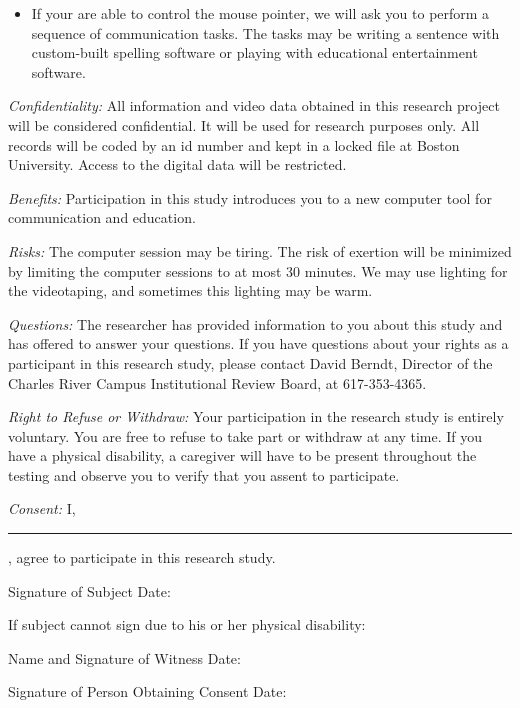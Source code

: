 \begin{letter}
\begin{itemize}
\item If your are able to control the mouse pointer, we will ask you
to perform a sequence of communication tasks.  The tasks may be
writing a sentence with custom-built spelling software or playing with
educational entertainment software.

\end{itemize}

{\em Confidentiality:}  All information and video data obtained in this
research project will be considered confidential.  It will be used for
research purposes only.  All records will be coded by an id number and
kept in a locked file at Boston University.  Access to the digital
data will be restricted.

{\em Benefits:} Participation in this study introduces you to a new
computer tool for communication and education.

{\em Risks:} The computer session may be tiring.  The risk of exertion
will be minimized by limiting the computer sessions to at most 30
minutes. We may use lighting for the videotaping, and sometimes this
lighting may be warm.


{\em Questions:} The researcher has provided information to you about
this study and has offered to answer your questions.  If you have
questions about your rights as a participant in this research study,
please contact David Berndt, Director of the Charles River Campus
Institutional Review Board, at 617-353-4365.


{\em Right to Refuse or Withdraw:} Your participation in the research
study is entirely voluntary.  You are free to refuse to take part or
withdraw at any time. If you have a physical disability, a caregiver
will have to be present throughout the testing and observe you to
verify that you assent to participate.

{\em Consent:} I,  \rule{5cm}{.01cm}, agree to participate in this research
study.

Signature of Subject \hrulefill  Date: \hrulefill

If subject cannot sign due to his or her physical disability:

Name and Signature of Witness \hrulefill  Date: \hrulefill


\vspace*{.5cm}


Signature of Person Obtaining Consent \hrulefill  Date: \hrulefill

\end{letter}

 